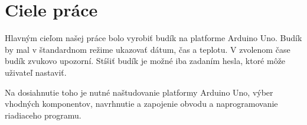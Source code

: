 \chapter{Ciele práce}
Hlavným cieľom našej práce bolo vyrobiť budík na platforme Arduino Uno. Budík by mal v štandardnom režime ukazovať dátum, čas a teplotu. V zvolenom čase budík zvukovo upozorní. Stíšiť budík je možné iba zadaním hesla, ktoré môže uživateľ nastaviť.

Na dosiahnutie toho je nutné naštudovanie platformy Arduino Uno, výber vhodných komponentov, navrhnutie a zapojenie obvodu a naprogramovanie riadiaceho programu.
